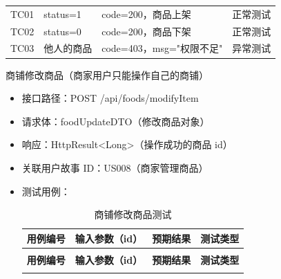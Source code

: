 \begin{levellist}
\begin{levellist}
\begin{itemize}
\begin{longtable}{>{\centering\arraybackslash}m{1.7cm} >{\centering\arraybackslash}m{3cm} >{\centering\arraybackslash}m{6.3cm} >{\centering\arraybackslash}m{2cm}}
                      \bottomrule
                      \endfoot

                      TC01          & status=1          & code=200，商品上架       & 正常测试          \\
                      TC02          & status=0          & code=200，商品下架       & 正常测试          \\
                      TC03          & 他人的商品             & code=403，msg="权限不足" & 异常测试          \\
                  \end{longtable}
        \end{itemize}

        \item 商铺修改商品（商家用户只能操作自己的商铺）
        \begin{itemize}
            \item 接口路径：POST /api/foods/modifyItem
            \item 请求体：foodUpdateDTO（修改商品对象）
            \item 响应：HttpResult<Long>（操作成功的商品 id）
            \item 关联用户故事 ID：US008（商家管理商品）
            \item 测试用例：
                  \begin{longtable}{>{\centering\arraybackslash}m{1.7cm} >{\centering\arraybackslash}m{3cm} >{\centering\arraybackslash}m{6.3cm} >{\centering\arraybackslash}m{2cm}}

                      \caption{商铺修改商品测试} \label{tab:training}                                 \\

                      \toprule
                      \textbf{用例编号} & \textbf{输入参数（id）} & \textbf{预期结果}       & \textbf{测试类型} \\
                      \midrule
                      \endfirsthead

                      \multicolumn{4}{c}{{\tablename\ \thetable{} 续表}}                        \\
                      \toprule
                      \textbf{用例编号} & \textbf{输入参数（id）} & \textbf{预期结果}       & \textbf{测试类型} \\
                      \midrule
                      \endhead

                      \bottomrule
                      \endfoot


\end{longtable}
\end{itemize}
\end{levellist}
\end{levellist}
